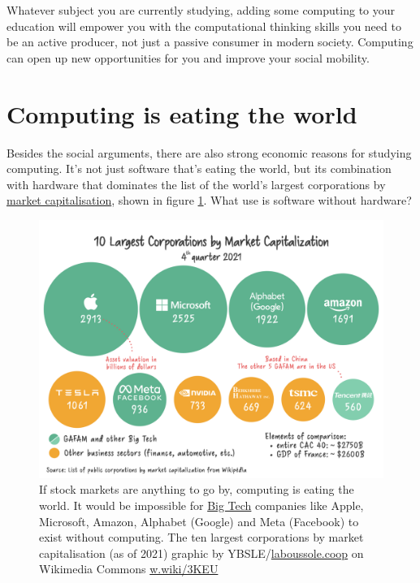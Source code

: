 \documentclass[
]{book}
\begin{document}
Whatever subject you are currently studying, adding some computing to your education will empower you with the computational thinking skills you need to be an active producer, not just a passive consumer in modern society. Computing can open up new opportunities for you and improve your social mobility.

\hypertarget{eating}{%
\section{Computing is eating the world}\label{eating}}

Besides the social arguments, there are also strong economic reasons for studying computing. It's not just software that's eating the world, but its combination with hardware that dominates the list of the world's largest corporations by \href{https://en.wikipedia.org/wiki/Market_capitalization}{market capitalisation}, shown in figure \ref{fig:market-fig}. What use is software without hardware?

\begin{figure}

{\centering \includegraphics[width=1\linewidth]{images/Market_Capitalisation} 

}

\caption{If stock markets are anything to go by, computing is eating the world. It would be impossible for \href{https://en.wikipedia.org/wiki/Big_Tech}{Big Tech} companies like Apple, Microsoft, Amazon, Alphabet (Google) and Meta (Facebook) to exist without computing. The ten largest corporations by market capitalisation (as of 2021) graphic by YBSLE/\href{https://laboussole.coop/}{laboussole.coop} on Wikimedia Commons \href{https://w.wiki/3KEU}{w.wiki/3KEU}}\label{fig:market-fig}
\end{figure}
\end{document}

